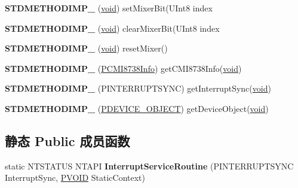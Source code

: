 \begin{DoxyCompactItemize}
\item 
\mbox{\label{class_c_c_m_i_adapter_a5fb610a5e72092e89b701eb4347b5c63}} 
{\bfseries S\+T\+D\+M\+E\+T\+H\+O\+D\+I\+M\+P\+\_\+} (\hyperlink{interfacevoid}{void}) set\+Mixer\+Bit(U\+Int8 index
\item 
\mbox{\label{class_c_c_m_i_adapter_a2573b7dad7c941417c177568a74e5144}} 
{\bfseries S\+T\+D\+M\+E\+T\+H\+O\+D\+I\+M\+P\+\_\+} (\hyperlink{interfacevoid}{void}) clear\+Mixer\+Bit(U\+Int8 index
\item 
\mbox{\label{class_c_c_m_i_adapter_affc0da698de838baa907e6010ec50285}} 
{\bfseries S\+T\+D\+M\+E\+T\+H\+O\+D\+I\+M\+P\+\_\+} (\hyperlink{interfacevoid}{void}) reset\+Mixer()
\item 
\mbox{\label{class_c_c_m_i_adapter_ac504dd7804e9c75672572331a0a953a5}} 
{\bfseries S\+T\+D\+M\+E\+T\+H\+O\+D\+I\+M\+P\+\_\+} (\hyperlink{struct_c_m_i8738_info}{P\+C\+M\+I8738\+Info}) get\+C\+M\+I8738\+Info(\hyperlink{interfacevoid}{void})
\item 
\mbox{\label{class_c_c_m_i_adapter_a56ac2347b2202071e8cefa3969751b0b}} 
{\bfseries S\+T\+D\+M\+E\+T\+H\+O\+D\+I\+M\+P\+\_\+} (P\+I\+N\+T\+E\+R\+R\+U\+P\+T\+S\+Y\+NC) get\+Interrupt\+Sync(\hyperlink{interfacevoid}{void})
\item 
\mbox{\label{class_c_c_m_i_adapter_ad63c0db8e3d75294996ff5d4b6d870c5}} 
{\bfseries S\+T\+D\+M\+E\+T\+H\+O\+D\+I\+M\+P\+\_\+} (\hyperlink{struct___d_e_v_i_c_e___o_b_j_e_c_t}{P\+D\+E\+V\+I\+C\+E\+\_\+\+O\+B\+J\+E\+CT}) get\+Device\+Object(\hyperlink{interfacevoid}{void})
\end{DoxyCompactItemize}
\subsection*{静态 Public 成员函数}
\begin{DoxyCompactItemize}
\item 
\mbox{\label{class_c_c_m_i_adapter_a1a5cb5280564fbbacb66915f7e4465f0}} 
static N\+T\+S\+T\+A\+T\+US N\+T\+A\+PI {\bfseries Interrupt\+Service\+Routine} (P\+I\+N\+T\+E\+R\+R\+U\+P\+T\+S\+Y\+NC Interrupt\+Sync, \hyperlink{interfacevoid}{P\+V\+O\+ID} Static\+Context)
\end{DoxyCompactItemize}
